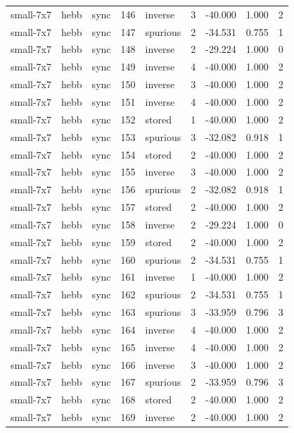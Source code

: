 \begin{tabular}{lllrlrrrr}
small-7x7 & hebb & sync & 146 & inverse & 3 & -40.000 & 1.000 & 2 \\
small-7x7 & hebb & sync & 147 & spurious & 2 & -34.531 & 0.755 & 1 \\
small-7x7 & hebb & sync & 148 & inverse & 2 & -29.224 & 1.000 & 0 \\
small-7x7 & hebb & sync & 149 & inverse & 4 & -40.000 & 1.000 & 2 \\
small-7x7 & hebb & sync & 150 & inverse & 3 & -40.000 & 1.000 & 2 \\
small-7x7 & hebb & sync & 151 & inverse & 4 & -40.000 & 1.000 & 2 \\
small-7x7 & hebb & sync & 152 & stored & 1 & -40.000 & 1.000 & 2 \\
small-7x7 & hebb & sync & 153 & spurious & 3 & -32.082 & 0.918 & 1 \\
small-7x7 & hebb & sync & 154 & stored & 2 & -40.000 & 1.000 & 2 \\
small-7x7 & hebb & sync & 155 & inverse & 3 & -40.000 & 1.000 & 2 \\
small-7x7 & hebb & sync & 156 & spurious & 2 & -32.082 & 0.918 & 1 \\
small-7x7 & hebb & sync & 157 & stored & 2 & -40.000 & 1.000 & 2 \\
small-7x7 & hebb & sync & 158 & inverse & 2 & -29.224 & 1.000 & 0 \\
small-7x7 & hebb & sync & 159 & stored & 2 & -40.000 & 1.000 & 2 \\
small-7x7 & hebb & sync & 160 & spurious & 2 & -34.531 & 0.755 & 1 \\
small-7x7 & hebb & sync & 161 & inverse & 1 & -40.000 & 1.000 & 2 \\
small-7x7 & hebb & sync & 162 & spurious & 2 & -34.531 & 0.755 & 1 \\
small-7x7 & hebb & sync & 163 & spurious & 3 & -33.959 & 0.796 & 3 \\
small-7x7 & hebb & sync & 164 & inverse & 4 & -40.000 & 1.000 & 2 \\
small-7x7 & hebb & sync & 165 & inverse & 4 & -40.000 & 1.000 & 2 \\
small-7x7 & hebb & sync & 166 & inverse & 3 & -40.000 & 1.000 & 2 \\
small-7x7 & hebb & sync & 167 & spurious & 2 & -33.959 & 0.796 & 3 \\
small-7x7 & hebb & sync & 168 & stored & 2 & -40.000 & 1.000 & 2 \\
small-7x7 & hebb & sync & 169 & inverse & 2 & -40.000 & 1.000 & 2 \\

\end{tabular}
